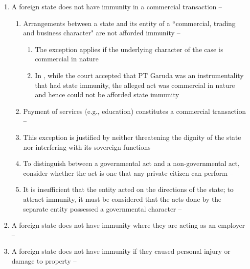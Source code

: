 \begin{enumerate}
\begin{enumerate}
        \item A foreign state does not have immunity in a commercial transaction -- 
        \begin{enumerate}
            \item Arrangements between a state and its entity of a ``commercial, trading and business character" are not afforded immunity -- 
            \begin{enumerate}
                \item The exception applies if the underlying character of the case is commercial in nature
                \item In , while the court accepted that PT Garuda was an instrumentality that had state immunity, the alleged act was commercial in nature and hence could not be afforded state immunity
            \end{enumerate}
            \item Payment of services (e.g., education) constitutes a commercial transaction -- 
            \item This exception is justified by neither threatening the dignity of the state nor interfering with its sovereign functions -- 
            \item To distinguish between a governmental act and a non-governmental act, consider whether the act is one that any private citizen can perform -- 
            \item It is insufficient that the entity acted on the directions of the state; to attract immunity, it must be considered that the acts done by the separate entity possessed a governmental character -- 
        \end{enumerate}
        \item A foreign state does not have immunity where they are acting as an employer -- 
        \item A foreign state does not have immunity if they caused personal injury or damage to property -- 

\end{enumerate}
\end{enumerate}
